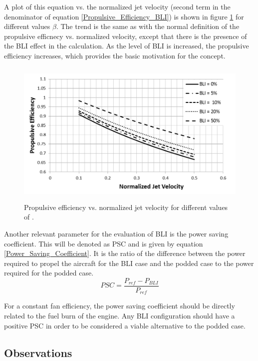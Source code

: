 \documentclass[12pt]{gatech-thesis}
\begin{document}
A plot of this equation vs. the normalized jet velocity (second term in the denominator of equation \ref{Propulsive_Efficiency_BLI}) is shown in figure \ref{Propulsive_Efficiency_Plot} for different values $\beta$.  The trend is the same as with the normal definition of the propulsive efficnecy vs. normalized velocity, except that there is the presence of the BLI effect in the calculation.  As the level of BLI is increased, the propulsive efficiency increases, which provides the basic motivation for the concept.
	\begin{figure}[htpb]
	\centering
	\includegraphics[width=120mm, height =70mm, trim=1mm 1mm 1mm 1mm, clip=true]{Figure6_Propulsive_Efficiency.png}
	\caption{Propulsive efficiency vs. normalized jet velocity for different values of \cite{Plas2007}.}
	\label{Propulsive_Efficiency_Plot}
	\end{figure}

Another relevant parameter for the evaluation of BLI is the power saving coefficient.  This will be denoted as PSC and is given by equation \ref{Power_Saving_Coefficient}.  It is the ratio of the difference between the power required to propel the aircraft for the BLI case and the podded case to the power required for the podded case.
\begin{equation}PSC = \frac{P_{ref} - P_{BLI}}
			              {P_{ref}}\label{Power_Saving_Coefficient}\end{equation}%

For a constant fan efficiency, the power saving coefficient should be directly related to the fuel burn of the engine.  Any BLI configuration should have a positive PSC in order to be considered a viable alternative to the podded case.

\subsection{Observations}
\end{document}
